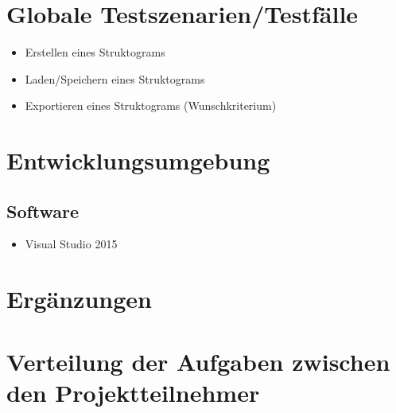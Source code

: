\documentclass[a4paper,10pt]{report}
\begin{document}
\section{Globale Testszenarien/Testfälle}
\begin{itemize}
\item  Erstellen eines Struktograms
\item  Laden/Speichern eines Struktograms
\item  Exportieren eines Struktograms (Wunschkriterium)
\end{itemize}
\section{Entwicklungsumgebung}
\subsection{Software}
\begin{itemize}
\item Visual Studio 2015
\end{itemize}
\section{Ergänzungen}
\section{Verteilung der Aufgaben zwischen den Projektteilnehmer}
\end{document}
